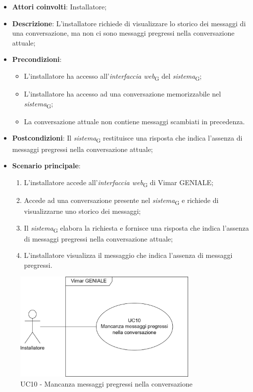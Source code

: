 \begin{itemize}
    \item \textbf{Attori coinvolti}: Installatore;
    \item \textbf{Descrizione}: L’installatore richiede di visualizzare lo storico dei messaggi di una conversazione, ma non ci sono messaggi pregressi nella conversazione attuale;
    \item \textbf{Precondizioni}: 
        \begin{itemize}
            \item L’installatore ha accesso all’\textit{interfaccia web}\textsubscript{G} del \textit{sistema}\textsubscript{G};
            \item L’installatore ha accesso ad una conversazione memorizzabile nel \textit{sistema}\textsubscript{G};
            \item La conversazione attuale non contiene messaggi scambiati in precedenza.
        \end{itemize}
    \item \textbf{Postcondizioni}: Il \textit{sistema}\textsubscript{G} restituisce una risposta che indica l’assenza di messaggi pregressi nella conversazione attuale;
    \item \textbf{Scenario principale}:
    \begin{enumerate}
    \item L’installatore accede all’\textit{interfaccia web}\textsubscript{G} di Vimar GENIALE;
    \item Accede ad una conversazione presente nel \textit{sistema}\textsubscript{G} e richiede di visualizzarne uno storico dei messaggi;
    \item Il \textit{sistema}\textsubscript{G} elabora la richiesta e fornisce una risposta che indica l’assenza di messaggi pregressi nella conversazione attuale;
    \item L’installatore visualizza il messaggio che indica l’assenza di messaggi pregressi.
    \end{enumerate}
\end{itemize}
\begin{figure}[H]
\centering
\includegraphics[width=0.8\textwidth]{contents/casi_duso/png/UC10.png}
\caption{UC10 - Mancanza messaggi pregressi nella conversazione}
\end{figure}


